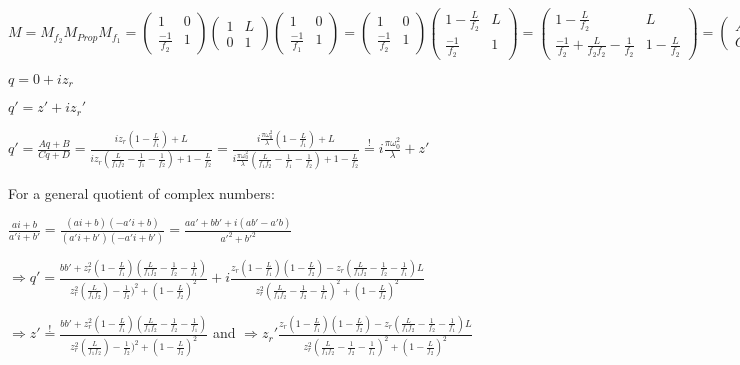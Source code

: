 \documentclass{article}
\newcommand{\mbeq}{\overset{!}{=}}
\begin{document}
 $M = M_{f_2}M_{Prop}M_{f_1}=\begin{pmatrix}1 & 0\\ \frac{-1}{f_2} & 1
\end{pmatrix}\begin{pmatrix}1 & L\\ 0 & 1
\end{pmatrix}\begin{pmatrix}1 & 0\\ \frac{-1}{f_1} & 1
\end{pmatrix} =\begin{pmatrix}1 & 0\\ \frac{-1}{f_2} & 1
\end{pmatrix}\begin{pmatrix} 1-\frac{L}{f_2} & L\\ \frac{-1}{f_2} & 1
\end{pmatrix} = \begin{pmatrix} 1-\frac{L}{f_2} & L\\ \frac{-1}{f_2}+\frac{L}{f_2 f_2}-\frac{1}{f_2} & 1-\frac{L}{f_2}
\end{pmatrix}
 = \begin{pmatrix} A&B\\C&D\end{pmatrix}$

\setlength{\parskip}{2em}

$
q=0+iz_r$\par$
{q}'={z}'+i{z_r}'
$

${q}'=\frac{Aq+B}{Cq+D}=\frac{iz_r(1-\frac{L}{f_1})+L}{iz_r(\frac{L}{f_1 f_2}-\frac{1}{f_1}-\frac{1}{f_2})+1-\frac{L}{f_2}}=\frac{i\frac{\pi\omega_0^2}{\lambda}(1-\frac{L}{f_1})+L}{i\frac{\pi\omega_0^2}{\lambda}(\frac{L}{f_1 f_2}-\frac{1}{f_1}-\frac{1}{f_2})+1-\frac{L}{f_2}}\mbeq i\frac{\pi\omega_0^2}{\lambda}+{z}'$ 


For a general quotient of complex numbers:

$\frac{ai+b}{{a}'i+{b}'}=\frac{(ai+b)(-{a}'i+b)}{({a}'i+{b}')(-{a}'i+{b}')}=\frac{a{a}'+b{b}'+i(a{b}'-{a}'b)}{{a}'^2+{b}'^2}
$

$\Rightarrow{} {q}' = \frac{b{b}'+z_r^2(1-\frac{L}{f_1})(\frac{L}{f_1 f_2}-\frac{1}{f_2}-\frac{1}{f_1})}{z_r^2(\frac{L}{f_1 f_2})-\frac{1}{f_2})^2+(1-\frac{L}{f_2})^2}+i\frac{z_r(1-\frac{L}{f_1})(1-\frac{L}{f_2})-z_r(\frac{L}{f_1 f_2}-\frac{1}{f_2}-\frac{1}{f_1})L}{z_r^2(\frac{L}{f_1 f_2}-\frac{1}{f_2}-\frac{1}{f_1})^2+(1-\frac{L}{f_2})^2}
$

$\Rightarrow{} {z}'\mbeq \frac{b{b}'+z_r^2(1-\frac{L}{f_1})(\frac{L}{f_1 f_2}-\frac{1}{f_2}-\frac{1}{f_1})}{z_r^2(\frac{L}{f_1 f_2})-\frac{1}{f_2})^2+(1-\frac{L}{f_2})^2} $
 and
 $\Rightarrow{}{} {z_r}' \frac{z_r(1-\frac{L}{f_1})(1-\frac{L}{f_2})-z_r(\frac{L}{f_1 f_2}-\frac{1}{f_2}-\frac{1}{f_1})L}{z_r^2(\frac{L}{f_1 f_2}-\frac{1}{f_2}-\frac{1}{f_1})^2+(1-\frac{L}{f_2})^2}$
 
\end{document}
